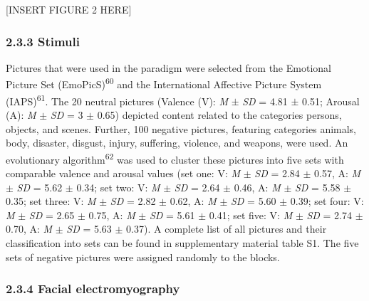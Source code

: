 \documentclass[
  man,floatsintext]{apa6}
\begin{document}
{[}INSERT FIGURE 2 HERE{]}

\hypertarget{stimuli}{%
\subsubsection{2.3.3 Stimuli}\label{stimuli}}

Pictures that were used in the paradigm were selected from the Emotional Picture Set (EmoPicS)\textsuperscript{60} and the International Affective Picture System (IAPS)\textsuperscript{61}.
The 20 neutral pictures (Valence (V): \emph{M} \(\pm\) \emph{SD} = 4.81 \(\pm\) 0.51; Arousal (A): \emph{M} \(\pm\) \emph{SD} = 3 \(\pm\) 0.65) depicted content related to the categories persons, objects, and scenes.
Further, 100 negative pictures, featuring categories animals, body, disaster, disgust, injury, suffering, violence, and weapons, were used.
An evolutionary algorithm\textsuperscript{62} was used to cluster these pictures into five sets with comparable valence and arousal values (set one: V: \emph{M} \(\pm\) \emph{SD} = 2.84 \(\pm\) 0.57, A: \emph{M} \(\pm\) \emph{SD} = 5.62 \(\pm\) 0.34; set two: V: \emph{M} \(\pm\) \emph{SD} = 2.64 \(\pm\) 0.46, A: \emph{M} \(\pm\) \emph{SD} = 5.58 \(\pm\) 0.35; set three: V: \emph{M} \(\pm\) \emph{SD} = 2.82 \(\pm\) 0.62, A: \emph{M} \(\pm\) \emph{SD} = 5.60 \(\pm\) 0.39; set four: V: \emph{M} \(\pm\) \emph{SD} = 2.65 \(\pm\) 0.75, A: \emph{M} \(\pm\) \emph{SD} = 5.61 \(\pm\) 0.41; set five: V: \emph{M} \(\pm\) \emph{SD} = 2.74 \(\pm\) 0.70, A: \emph{M} \(\pm\) \emph{SD} = 5.63 \(\pm\) 0.37).
A complete list of all pictures and their classification into sets can be found in supplementary material table S1.
The five sets of negative pictures were assigned randomly to the blocks.

\hypertarget{facial-electromyography}{%
\subsubsection{2.3.4 Facial electromyography}\label{facial-electromyography}}
\end{document}
